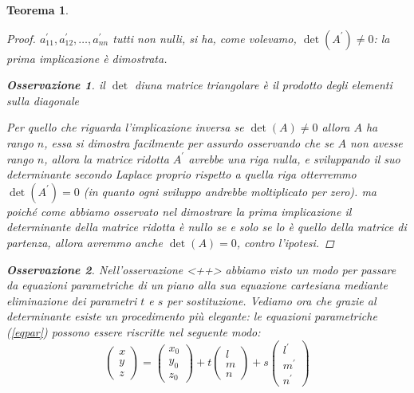 \documentclass{book}
\newtheorem{teorema}{Teorema}
\newtheorem{osservazione}{Osservazione}
\begin{document}
\begin{teorema}
\begin{proof}
    $a^\prime_{11},a_{12}^\prime,\dots, a_{nn}^\prime$ tutti non nulli, si ha, come volevamo,
    $\det(A^\prime)\neq 0$: la prima implicazione è dimostrata.
    \begin{osservazione}
      il $\det$ diuna matrice triangolare è il prodotto degli elementi sulla diagonale
    \end{osservazione}
    Per quello che riguarda l'implicazione inversa se $\det (A)\neq 0$ allora $A$ ha rango $n$,
    essa si dimostra facilmente per assurdo osservando che se $A$ non avesse rango $n$, allora
    la matrice ridotta $A^\prime$ avrebbe una riga nulla, e sviluppando il suo determinante
    secondo Laplace proprio rispetto a quella riga otterremmo $\det(A^\prime) = 0$ (in quanto ogni
    sviluppo andrebbe moltiplicato per zero). ma poiché come abbiamo osservato nel dimostrare la
    prima implicazione il determinante della matrice ridotta è nullo se e solo se lo è quello
    della matrice di partenza, allora avremmo anche $\det(A)=0$, contro l'ipotesi.
  \end{proof}
  \begin{osservazione}
    Nell'osservazione <++> abbiamo visto un modo per passare da equazioni parametriche di un
    piano alla sua equazione cartesiana mediante eliminazione dei parametri $t$ e $s$ per
    sostituzione. Vediamo ora che grazie al determinante esiste un procedimento più elegante:
    le equazioni parametriche (\ref{eqpar}) possono essere riscritte nel seguente modo:
    \begin{equation*}
      \begin{pmatrix}
        x\\
        y\\
        z
      \end{pmatrix}
      =\begin{pmatrix}
         x_0\\
         y_0\\
         z_0
       \end{pmatrix}
       +t\begin{pmatrix}
           l\\
           m\\
           n
         \end{pmatrix}
         +s\begin{pmatrix}
            l^\prime\\
            m^\prime\\
            n^\prime
          \end{pmatrix}
    \end{equation*}

\end{osservazione}
\end{teorema}
\end{document}

